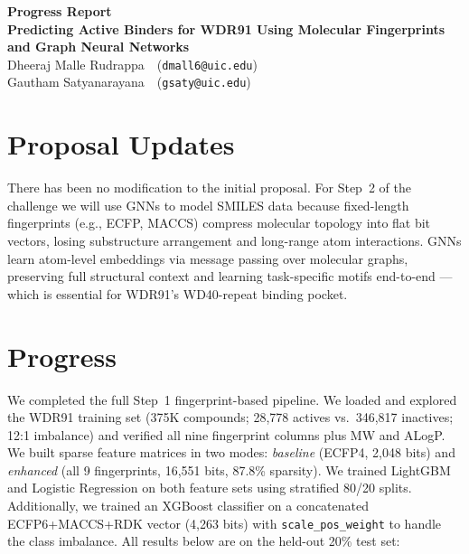 \documentclass[11pt, letterpaper]{article}
\begin{document}
{\centering
\textbf{\large Progress Report}\\[8pt]
\textbf{Predicting Active Binders for WDR91 Using Molecular Fingerprints and Graph Neural Networks}\\[6pt]
Dheeraj Malle Rudrappa\ \ (\texttt{dmall6@uic.edu})\\[3pt]
Gautham Satyanarayana\ \ (\texttt{gsaty@uic.edu})\\[8pt]
}

\section*{Proposal Updates}

There has been no modification to the initial proposal. For Step~2 of the challenge we will use GNNs to model SMILES data because fixed-length fingerprints (e.g., ECFP, MACCS) compress molecular topology into flat bit vectors, losing substructure arrangement and long-range atom interactions. GNNs learn atom-level embeddings via message passing over molecular graphs, preserving full structural context and learning task-specific motifs end-to-end --- which is essential for WDR91's WD40-repeat binding pocket.

\section*{Progress}

We completed the full Step~1 fingerprint-based pipeline. We loaded and explored the WDR91 training set (375K compounds; 28,778 actives vs.\ 346,817 inactives; 12:1 imbalance) and verified all nine fingerprint columns plus MW and ALogP. We built sparse feature matrices in two modes: \emph{baseline} (ECFP4, 2,048 bits) and \emph{enhanced} (all 9 fingerprints, 16,551 bits, 87.8\% sparsity). We trained LightGBM and Logistic Regression on both feature sets using stratified 80/20 splits. Additionally, we trained an XGBoost classifier on a concatenated ECFP6+MACCS+RDK vector (4,263 bits) with \texttt{scale\_pos\_weight} to handle the class imbalance. All results below are on the held-out 20\% test set:
\end{document}
